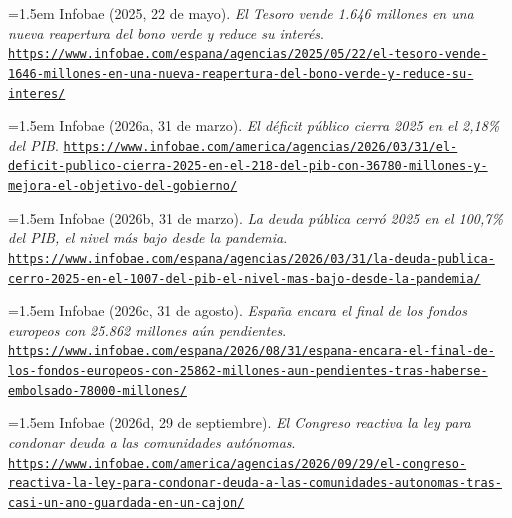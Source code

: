 \documentclass[10pt,a4paper]{article}
\begin{document}
\noindent\hangindent=1.5em Infobae (2025, 22 de mayo). \textit{El Tesoro vende 1.646 millones en una nueva reapertura del bono verde y reduce su interés}. \href{https://www.infobae.com/espana/agencias/2025/05/22/el-tesoro-vende-1646-millones-en-una-nueva-reapertura-del-bono-verde-y-reduce-su-interes/}{\nolinkurl{https://www.infobae.com/espana/agencias/2025/05/22/el-tesoro-vende-1646-millones-en-una-nueva-reapertura-del-bono-verde-y-reduce-su-interes/}}

\noindent\hangindent=1.5em Infobae (2026a, 31 de marzo). \textit{El déficit público cierra 2025 en el 2,18\% del PIB}. \href{https://www.infobae.com/america/agencias/2026/03/31/el-deficit-publico-cierra-2025-en-el-218-del-pib-con-36780-millones-y-mejora-el-objetivo-del-gobierno/}{\nolinkurl{https://www.infobae.com/america/agencias/2026/03/31/el-deficit-publico-cierra-2025-en-el-218-del-pib-con-36780-millones-y-mejora-el-objetivo-del-gobierno/}}

\noindent\hangindent=1.5em Infobae (2026b, 31 de marzo). \textit{La deuda pública cerró 2025 en el 100,7\% del PIB, el nivel más bajo desde la pandemia}. \href{https://www.infobae.com/espana/agencias/2026/03/31/la-deuda-publica-cerro-2025-en-el-1007-del-pib-el-nivel-mas-bajo-desde-la-pandemia/}{\nolinkurl{https://www.infobae.com/espana/agencias/2026/03/31/la-deuda-publica-cerro-2025-en-el-1007-del-pib-el-nivel-mas-bajo-desde-la-pandemia/}}

\noindent\hangindent=1.5em Infobae (2026c, 31 de agosto). \textit{España encara el final de los fondos europeos con 25.862 millones aún pendientes}. \href{https://www.infobae.com/espana/2026/08/31/espana-encara-el-final-de-los-fondos-europeos-con-25862-millones-aun-pendientes-tras-haberse-embolsado-78000-millones/}{\nolinkurl{https://www.infobae.com/espana/2026/08/31/espana-encara-el-final-de-los-fondos-europeos-con-25862-millones-aun-pendientes-tras-haberse-embolsado-78000-millones/}}

\noindent\hangindent=1.5em Infobae (2026d, 29 de septiembre). \textit{El Congreso reactiva la ley para condonar deuda a las comunidades autónomas}. \href{https://www.infobae.com/america/agencias/2026/09/29/el-congreso-reactiva-la-ley-para-condonar-deuda-a-las-comunidades-autonomas-tras-casi-un-ano-guardada-en-un-cajon/}{\nolinkurl{https://www.infobae.com/america/agencias/2026/09/29/el-congreso-reactiva-la-ley-para-condonar-deuda-a-las-comunidades-autonomas-tras-casi-un-ano-guardada-en-un-cajon/}}
\end{document}
